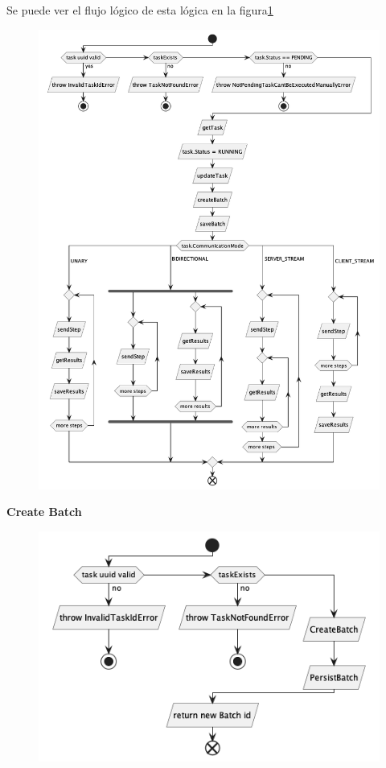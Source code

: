 Se puede ver el flujo lógico de esta lógica en la figura\ref{fig:1-TaskProcessor}

\begin{figure}[H]
    \centering
    \includegraphics[height=0.5\textheight]{./part/Proyecto_ejecutivo/memoria_descriptiva/descripcionDelProyecto/manager/uml/1-TaskProcessor}
    \caption[Diagrama de objetos de dominio]{}\label{fig:1-TaskProcessor}
\end{figure}


\textbf{Create Batch}

\begin{figure}[H]
    \centering
    \includegraphics[height=0.2\textheight]{./part/Proyecto_ejecutivo/memoria_descriptiva/descripcionDelProyecto/manager/uml/createBatchUseCase}
    \caption[Diagrama de objetos de dominio]{}\label{fig:createBatchUseCase}
\end{figure}


